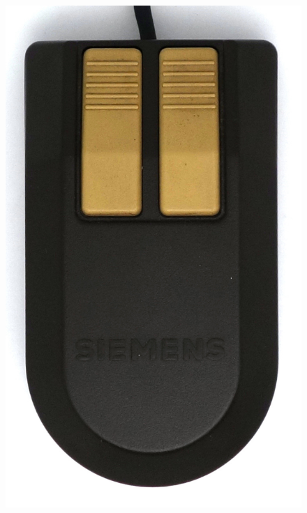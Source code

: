 \documentclass[11pt, a4paper]{article}
\begin{document}
\begin{figure}[h]
    \centering
    \includegraphics[scale=0.45]{1985_siemens_pcd_mouse/top_30.jpg}

\end{figure}
\end{document}
